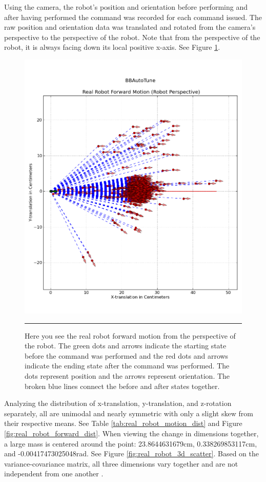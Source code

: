 Using the camera, the robot's position and orientation before performing and after having performed the command was recorded for each command issued. The raw position and orientation data was translated and rotated from the camera's perspective to the perspective of the robot. Note that from the perspective of the robot, it is always facing down its local positive x-axis. See Figure \ref{fig:real_robot_forward_motion}.

\begin{figure}[htbp]
\centering
\includegraphics[scale=0.6]{../Figures/Chapter4/real_robot_forward_motion.png}
\rule{35em}{0.5pt}
\caption[Real Robot Forward Motion]{Here you see the real robot forward motion from the perspective of the robot. The green dots and arrows indicate the starting state before the command was performed and the red dots and arrows indicate the ending state after the command was performed. The dots represent position and the arrows represent orientation. The broken blue lines connect the before and after states together.}
\label{fig:real_robot_forward_motion}
\end{figure}

Analyzing the distribution of x-translation, y-translation, and z-rotation separately, all are unimodal and nearly symmetric with only a slight skew from their respective means. See Table \ref{tab:real_robot_motion_dist} and Figure \ref{fig:real_robot_forward_dist}. When viewing the change in dimensions together, a large mass is centered around the point: 23.8644631679cm, 0.338269853117cm, and -0.00417473025048rad. See Figure \ref{fig:real_robot_3d_scatter}. Based on the variance-covariance matrix, all three dimensions vary together and are not independent from one another . 

